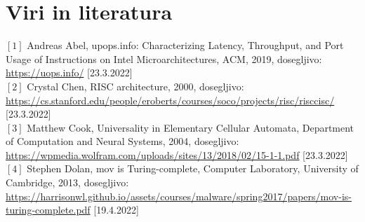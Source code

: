 \documentclass[12pt]{article}
\begin{document}
\pagebreak
\section{Viri in literatura}
$[1]$ Andreas Abel, upops.info: Characterizing Latency, Throughput, and Port Usage of Instructions on Intel Microarchitectures, ACM, 2019, dosegljivo: \url{https://uops.info/} [23.3.2022]\\
$[2]$ Crystal Chen, RISC architecture, 2000, dosegljivo: \url{https://cs.stanford.edu/people/eroberts/courses/soco/projects/risc/risccisc/} [23.3.2022]\\
$[3]$ Matthew Cook, Universality in Elementary Cellular Automata, Department of Computation and Neural Systems, 2004, dosegljivo: \url{https://wpmedia.wolfram.com/uploads/sites/13/2018/02/15-1-1.pdf} [23.3.2022]\\
$[4]$ Stephen Dolan, mov is Turing-complete, Computer Laboratory, University of Cambridge, 2013, dosegljivo: \url{https://harrisonwl.github.io/assets/courses/malware/spring2017/papers/mov-is-turing-complete.pdf} [19.4.2022]\\

\end{document}
